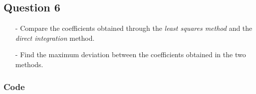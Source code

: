 \documentclass[11pt, a4paper, twoside]{article}
\begin{document}
        \subsection{Question 6}
            \begin{itemize}
                \item[-] Compare the coefficients obtained through the \textit{least squares method} and the \textit{direct integration} method.
                \item[-] Find the maximum deviation between the coefficients obtained in the two methods.
            \end{itemize}
            \subsubsection{Code}
                \inputminted[linenos, breaklines]{python}{Code/q6.py}
\end{document}
